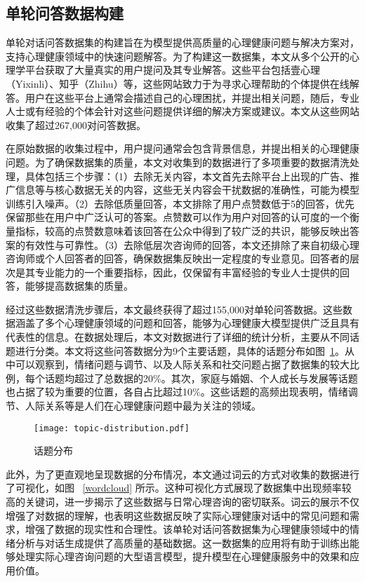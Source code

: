 \subsection{单轮问答数据构建}

单轮对话问答数据集的构建旨在为模型提供高质量的心理健康问题与解决方案对，支持心理健康领域中的快速问题解答。为了构建这一数据集，本文从多个公开的心理学平台获取了大量真实的用户提问及其专业解答。这些平台包括壹心理（Yixinli）、知乎（Zhihu）等，这些网站致力于为寻求心理帮助的个体提供在线解答。用户在这些平台上通常会描述自己的心理困扰，并提出相关问题，随后，专业人士或有经验的个体会针对这些问题提供详细的解决方案或建议。本文从这些网站收集了超过267,000对问答数据。

在原始数据的收集过程中，用户提问通常会包含背景信息，并提出相关的心理健康问题。为了确保数据集的质量，本文对收集到的数据进行了多项重要的数据清洗处理，具体包括三个步骤：（1）去除无关内容，本文首先去除平台上出现的广告、推广信息等与核心数据无关的内容，这些无关内容会干扰数据的准确性，可能为模型训练引入噪声。（2）去除低质量回答，本文排除了用户点赞数低于5的回答，优先保留那些在用户中广泛认可的答案。点赞数可以作为用户对回答的认可度的一个衡量指标，较高的点赞数意味着该回答在公众中得到了较广泛的共识，能够反映出答案的有效性与可靠性。（3）去除低层次咨询师的回答，本文还排除了来自初级心理咨询师或个人回答者的回答，确保数据集反映出一定程度的专业意见。回答者的层次是其专业能力的一个重要指标，因此，仅保留有丰富经验的专业人士提供的回答，能够提高数据集的质量。

经过这些数据清洗步骤后，本文最终获得了超过155,000对单轮问答数据。这些数据涵盖了多个心理健康领域的问题和回答，能够为心理健康大模型提供广泛且具有代表性的信息。在数据处理后，本文对数据进行了详细的统计分析，主要从不同话题进行分类。本文将这些问答数据分为9个主要话题，具体的话题分布如图~\ref{topic-distribution}。从中可以观察到，情绪问题与调节、以及人际关系和社交问题占据了数据集的较大比例，每个话题均超过了总数据的20\%。其次，家庭与婚姻、个人成长与发展等话题也占据了较为重要的位置，各自占比超过10\%。这些话题的高频出现表明，情绪调节、人际关系等是人们在心理健康问题中最为关注的领域。

\begin{figure}[ht]
  \centering
  \texttt{[image: topic-distribution.pdf]}
  \caption{话题分布}
  \label{topic-distribution}
\end{figure}

此外，为了更直观地呈现数据的分布情况，本文通过词云的方式对收集的数据进行了可视化，如图 ~\ref{wordcloud} 所示。这种可视化方式展现了数据集中出现频率较高的关键词，进一步揭示了这些数据与日常心理咨询的密切联系。词云的展示不仅增强了对数据的理解，也表明这些数据反映了实际心理健康对话中的常见问题和需求，增强了数据的现实性和合理性。该单轮对话问答数据集为心理健康领域中的情绪分析与对话生成提供了高质量的基础数据。这一数据集的应用将有助于训练出能够处理实际心理咨询问题的大型语言模型，提升模型在心理健康服务中的效果和应用价值。

